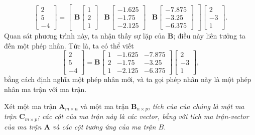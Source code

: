 \[\begin{bmatrix}
    2\\5\\-4
\end{bmatrix}=\begin{bmatrix}
    \mathbf{B}\begin{bmatrix}
        1\\2\\1
    \end{bmatrix}&\mathbf{B}\begin{bmatrix}
        -1.625\\-1.75\\-2.125
    \end{bmatrix}&\mathbf{B}\begin{bmatrix}
        -7.875\\-3.25\\-6.375
\end{bmatrix}\end{bmatrix}\begin{bmatrix}
2\\-3\\1
\end{bmatrix}.\] Quan sát phương trình này, ta nhận thấy sự lặp của \(\mathbf{B}\); điều này liên tưởng ta đến một phép nhân. 
Tức là, ta có thể viết 
\begin{equation}\label{eqmatrix}\begin{bmatrix}
    2\\5\\-4
\end{bmatrix}=\mathbf{B}\begin{bmatrix}
    1&-1.625&-7.875\\
    2&-1.75&-3.25\\
    1&-2.125&-6.375
\end{bmatrix}\begin{bmatrix}
    2\\-3\\1
\end{bmatrix},\end{equation} bằng cách định nghĩa một phép nhân mới, và ta gọi phép nhân này là một phép nhân ma trận với ma trận.
\vspace{8pt}

Xét một ma trận \(\mathbf{A}_{m\times n}\) và một ma trận \(\mathbf{B}_{n\times p}\), \emph{tích của của chúng là một ma trận \(\mathbf{C}_{m\times p}\); các cột của ma trận này là các vector, bằng với tích ma trận-vector của ma trận \(\mathbf{A}\) và các cột tương ứng  của ma trận \(B\).}
\vspace{8pt}

